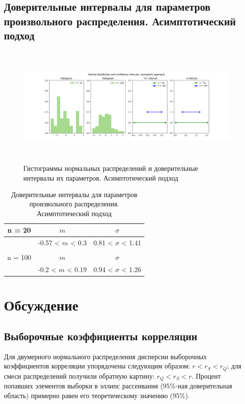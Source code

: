 \documentclass[a4paper]{article}
\begin{document}
\subsection{Доверительные интервалы для параметров произвольного распределения. Асимптотический подход}
    \begin{figure}[H]
		\centering
			\includegraphics[width = 18cm, height = 6cm]{./lab2_4/pictures/asymp.png}
		\caption{Гистограммы нормальных распределений и доверительные интервалы их параметров. Асимптотический подход}
		\label{w_pert}
	\end{figure}
	
	\begin{table}[H]
	    \centering
	    \begin{tabular}{| c | c | c |}
	    \hline
	       n = 20   &  $m$  & $\sigma$\\ \hline
	          &  -0.57 < $m$ < 0.3 & 0.81 < $\sigma$ < 1.41 \\ \hline
	         &   &   \\ \hline
	       n = 100   &  $m$  & $\sigma$\\ \hline
	        & -0.2 < $m$ < 0.19 & 0.94 < $\sigma$ < 1.26 \\
	   \hline
	    \end{tabular}
	    \caption{Доверительные интервалы для параметров произвольного распределения. Асимптотический подход}
	    \label{tab:interv_asimpt}
	\end{table}
\section{Обсуждение}
\subsection{Выборочные коэффициенты корреляции}
\noindent Для двумерного нормального распределения дисперсии выборочных коэффициентов корреляции упорядочены следующим образом: $r < r_{S} < r_{Q}$; для смеси распределений получили обратную картину: $r_{Q} < r_{S} < r$.
\newline
\noindent Процент попавших элементов выборки в эллипс рассеивания (95$\%$-ная доверительная область) примерно равен его теоретическому значению (95$\%$).
\end{document}
